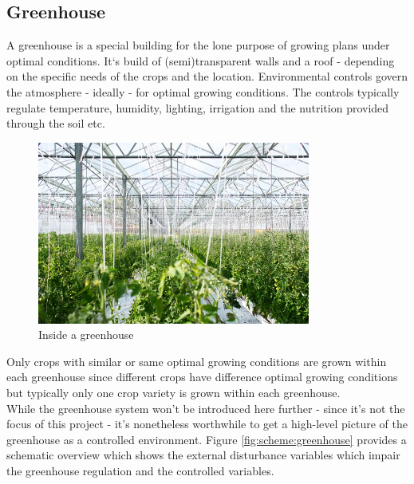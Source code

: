 \graphicspath{{members/ssr/figures/}}

\subsection{Greenhouse}\label{subsec:greenhouse}

A greenhouse is a special building for the lone purpose of growing plans under optimal
conditions.
It‘s build of (semi)transparent walls and a roof - depending on the specific
needs of the crops and the location.
Environmental controls govern the atmosphere - ideally - for optimal growing conditions.
The controls typically regulate temperature, humidity, lighting, irrigation and the
nutrition provided through the soil etc.\\

\begin{figure}[H]
    \centering
    \includegraphics[width=0.8\textwidth]{user-view/greeenhouse_erwan_hesry_unsplash.jpg}
    \caption{Inside a greenhouse}
\end{figure}

Only crops with similar or same optimal growing conditions are grown within each greenhouse
since different crops have difference optimal growing conditions but typically only one crop
variety is grown within each greenhouse.\\

While the greenhouse system won't be introduced here further - since it's not the focus
of this project - it's nonetheless worthwhile to get a high-level picture of the
greenhouse as a controlled environment.
Figure \ref{fig:scheme:greenhouse} provides a schematic overview which shows the external
disturbance variables which impair the greenhouse regulation and the controlled variables.

